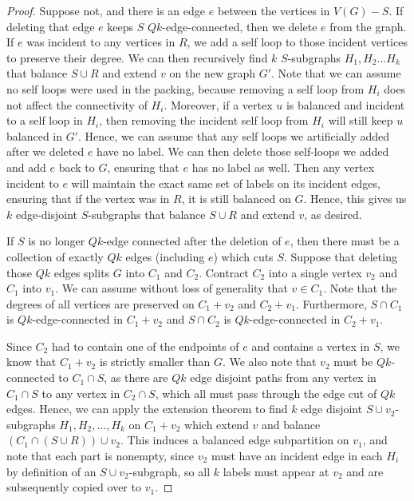\documentclass{article}
\begin{document}
\begin{proof}
    Suppose not, and there is an edge $e$ between the vertices in $V(G)-S$. If deleting that edge $e$ keeps $S$ $Qk$-edge-connected, then we delete $e$ from the graph. If $e$ was incident to any vertices in $R$, we add a self loop to those incident vertices to preserve their degree. We can then recursively find $k$ $S$-subgraphs $H_1,H_2...H_k$ that balance $S \cup R$ and extend $v$ on the new graph $G'$. Note that we can assume no self loops were used in the packing, because removing a self loop from $H_i$ does not affect the connectivity of $H_i$. Moreover, if a vertex $u$ is balanced and incident to a self loop in $H_i$, then removing the incident self loop from $H_i$ will still keep $u$ balanced in $G'$. Hence, we can assume that any self loops we artificially added after we deleted $e$ have no label. We can then delete those self-loops we added and add $e$ back to $G$, ensuring that $e$ has no label as well. Then any vertex incident to $e$ will maintain the exact same set of labels on its incident edges, ensuring that if the vertex was in $R$, it is still balanced on $G$. Hence, this gives us $k$ edge-disjoint $S$-subgraphs that balance $S \cup R$ and extend $v$, as desired. 
    
    If $S$ is no longer $Qk$-edge connected after the deletion of $e$, then there must be a collection of exactly $Qk$ edges (including $e$) which cuts $S$. Suppose that deleting those $Qk$ edges splits $G$ into $C_1$ and $C_2$. Contract $C_2$ into a single vertex $v_2$ and $C_1$ into $v_1$. We can assume without loss of generality that $v \in C_1$. Note that the degrees of all vertices are preserved on $C_1+v_2$ and $C_2+v_1$. Furthermore, $S \cap C_1$ is $Qk$-edge-connected in $C_1+v_2$ and $S \cap C_2$ is $Qk$-edge-connected in $C_2+v_1$. 

    Since $C_2$ had to contain one of the endpoints of $e$ and contains a vertex in $S$, we know that $C_1+v_2$ is strictly smaller than $G$. We also note that $v_2$ must be $Qk$-connected to $C_1 \cap S$, as there are $Qk$ edge disjoint paths from any vertex in $C_1 \cap S$ to any vertex in $C_2 \cap S$, which all must pass through the edge cut of $Qk$ edges. Hence, we can apply the extension theorem to find $k$ edge disjoint $S \cup v_2$-subgraphs $H_1, H_2,...,H_k$ on $C_1+v_2$ which extend $v$ and balance $(C_1 \cap (S  \cup R)) \cup v_2$. This induces a balanced edge subpartition on $v_1$, and note that each part is nonempty, since $v_2$ must have an incident edge in each $H_i$ by definition of an $S \cup v_2$-subgraph, so all $k$ labels must appear at $v_2$ and are subsequently copied over to $v_1$.
    

\end{proof}
\end{document}
